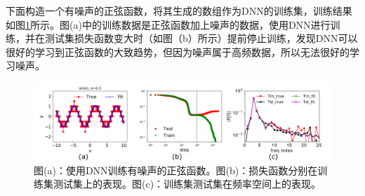 下面构造一个有噪声的正弦函数，将其生成的数组作为DNN的训练集，训练结果如图\ref{fprinciple1}\cite{xu2019frequency}所示。图(a)中的训练数据是正弦函数加上噪声的数据，使用DNN进行训练，并在测试集损失函数变大时（如图（b）所示）提前停止训练，发现DNN可以很好的学习到正弦函数的大致趋势，但因为噪声属于高频数据，所以无法很好的学习噪声。

\begin{figure}[htbp!]
    \centering
    \includegraphics[width=0.98\linewidth]{figures/fprinciple/Fig3.pdf}
    \caption{图(a)：使用DNN训练有噪声的正弦函数。图(b)：损失函数分别在训练集测试集上的表现。图(c)：训练集测试集在频率空间上的表现。}
    \label{fprinciple1}
\end{figure}


